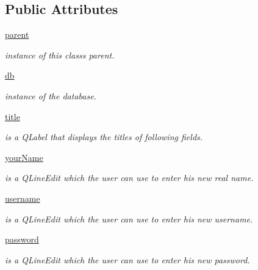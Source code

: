 \subsection*{Public Attributes}
\begin{DoxyCompactItemize}
\item 
\hyperlink{classsrc_1_1settings__menu_1_1_account_settings_menu_afe50b3829d1054937762620263272c4b}{parent}
\begin{DoxyCompactList}\small\item\em instance of this class\textquotesingle{}s parent. \end{DoxyCompactList}\item 
\hyperlink{classsrc_1_1settings__menu_1_1_account_settings_menu_a793f0abcc421d4f7e51d6ff02e3e86ea}{db}
\begin{DoxyCompactList}\small\item\em instance of the database. \end{DoxyCompactList}\item 
\hyperlink{classsrc_1_1settings__menu_1_1_account_settings_menu_a6f5f05b647982a9776c96ea5ca254068}{title}
\begin{DoxyCompactList}\small\item\em is a Q\+Label that displays the titles of following fields. \end{DoxyCompactList}\item 
\hyperlink{classsrc_1_1settings__menu_1_1_account_settings_menu_a72d6db1fc6e6253916fec2090e8ff914}{your\+Name}
\begin{DoxyCompactList}\small\item\em is a Q\+Line\+Edit which the user can use to enter his new real name. \end{DoxyCompactList}\item 
\hyperlink{classsrc_1_1settings__menu_1_1_account_settings_menu_a54d0681d7b2c05bc084bf686a5e0cf41}{username}
\begin{DoxyCompactList}\small\item\em is a Q\+Line\+Edit which the user can use to enter his new username. \end{DoxyCompactList}\item 
\hyperlink{classsrc_1_1settings__menu_1_1_account_settings_menu_a11ded2b607c6b7e0b756eef17952b1f6}{password}
\begin{DoxyCompactList}\small\item\em is a Q\+Line\+Edit which the user can use to enter his new password. \end{DoxyCompactList}\item 

\end{DoxyCompactItemize}
